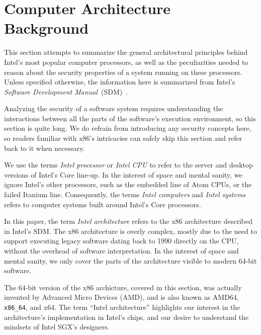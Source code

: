 \section{Computer Architecture Background}
\label{sec:architecture_background}

This section attempts to summarize the general architectural principles behind
Intel's most popular computer processors, as well as the peculiarities needed
to reason about the security properties of a system running on these
processors. Unless specified otherwise, the information here is summarized from
Intel's \textit{Software Development Manual}~(SDM)~\cite{intel2015sdm}.

Analyzing the security of a software system requires understanding the
interactions between all the parts of the software's execution environment, so
this section is quite long. We do refrain from introducing any security
concepts here, so readers familiar with x86's intricacies can safely skip this
section and refer back to it when necessary.

We use the terms \textit{Intel processor} or \textit{Intel CPU} to refer to the
server and desktop versions of Intel's Core line-up. In the interest of space
and mental sanity, we ignore Intel's other processors, such as the embedded
line of Atom CPUs, or the failed Itanium line. Consequently, the terms
\textit{Intel computers} and \textit{Intel systems} refers to computer systems
built around Intel's Core processors.

In this paper, the term \textit{Intel architecture} refers to the x86
architecture described in Intel's SDM. The x86 architecture is overly complex,
mostly due to the need to support executing legacy software dating back to 1990
directly on the CPU, without the overhead of software interpretation. In the
interest of space and mental sanity, we only cover the parts of the
architecture visible to modern 64-bit software.

The 64-bit version of the x86 archicture, covered in this section, was actually
invented by Advanced Micro Devices (AMD), and is also known as AMD64,
\texttt{x86\_64}, and x64. The term ``Intel architecture'' highlights our
interest in the architecture's implementation in Intel's chips, and our desire
to understand the mindsets of Intel SGX's designers.















